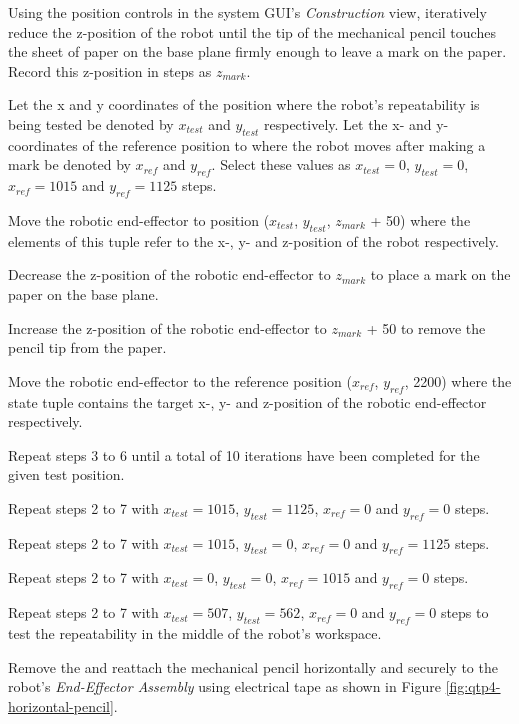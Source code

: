 \begin{compactenum}
	\item Using the position controls in the system GUI's \textit{Construction} view, iteratively reduce the z-position of the robot until the tip of the mechanical pencil touches the sheet of paper on the base plane firmly enough to leave a mark on the paper. Record this z-position in steps as $z_{mark}$.
	\item Let the x and y coordinates of the position where the robot's repeatability is being tested be denoted by $x_{test}$ and $y_{test}$ respectively. Let the x- and y- coordinates of the reference position to where the robot moves after making a mark be denoted by $x_{ref}$ and $y_{ref}$. Select these values as $x_{test}=0$, $y_{test}=0$, $x_{ref}=1015$ and $y_{ref}=1125$ steps.
	\item Move the robotic end-effector to position ($x_{test}$, $y_{test}$, $z_{mark}$ + 50) where the elements of this tuple refer to the x-, y- and z-position of the robot respectively.
	\item Decrease the z-position of the robotic end-effector to $z_{mark}$ to place a mark on the paper on the base plane.
	\item Increase the z-position of the robotic end-effector to $z_{mark}$ + 50 to remove the pencil tip from the paper.
	\item Move the robotic end-effector to the reference position ($x_{ref}$, $y_{ref}$, 2200) where the state tuple contains the target x-, y- and z-position of the robotic end-effector respectively.
	\item Repeat steps 3 to 6 until a total of 10 iterations have been completed for the given test position.
	\item Repeat steps 2 to 7 with  $x_{test}=1015$, $y_{test}=1125$, $x_{ref}=0$ and $y_{ref}=0$ steps.
	\item Repeat steps 2 to 7 with  $x_{test}=1015$, $y_{test}=0$, $x_{ref}=0$ and $y_{ref}=1125$ steps.
	\item Repeat steps 2 to 7 with  $x_{test}=0$, $y_{test}=0$, $x_{ref}=1015$ and $y_{ref}=0$ steps.
	\item Repeat steps 2 to 7 with  $x_{test}=507$, $y_{test}=562$, $x_{ref}=0$ and $y_{ref}=0$ steps to test the repeatability in the middle of the robot's workspace.
	\item Remove the and reattach the mechanical pencil horizontally and securely to the robot's \textit{End-Effector Assembly} using electrical tape as shown in Figure \ref{fig:qtp4-horizontal-pencil}.

\end{compactenum}

